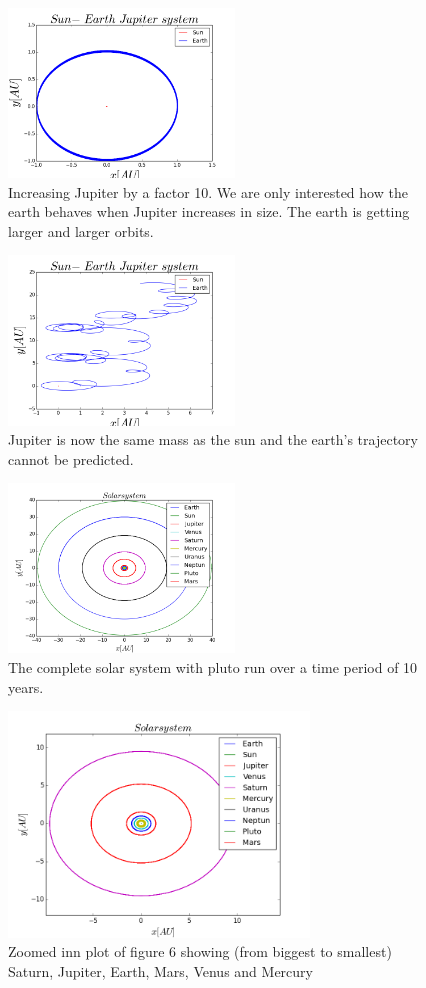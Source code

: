 \documentclass[twocolumn]{article}
\begin{document}
\begin{figure}[H]
\centering
\includegraphics[width=6cm]{sun_earth_bigmass.png}
\caption{Increasing Jupiter by a factor 10. We are only interested how the earth behaves when Jupiter increases in size. The earth is getting larger and larger orbits.}
\end{figure}
\begin{figure}[H]
\centering
\includegraphics[width=6cm]{Sun_earth_hugemass.png}
\caption{Jupiter is now the same mass as the sun and the earth's trajectory cannot be predicted.}
\end{figure}
\begin{figure}[H]
\centering
\includegraphics[width=6cm]{Solarsystem.png}
\caption{The complete solar system with pluto run over a time period of 10 years.}
\end{figure}
\begin{figure}[H]
\centering
\includegraphics[width=8cm]{Solarsystem_zoom.png}
\caption{Zoomed inn plot of figure 6 showing (from biggest to smallest) Saturn, Jupiter, Earth, Mars, Venus and Mercury}
\end{figure}
\end{document}
